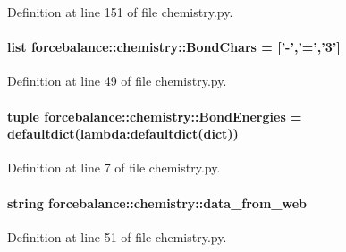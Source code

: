 \-Definition at line 151 of file chemistry.\-py.

\hypertarget{namespaceforcebalance_1_1chemistry_a70b1983d2e59ef37617b0a80a3fd14c9}{
\paragraph[{\-Bond\-Chars}]{\setlength{\rightskip}{0pt plus 5cm}list {\bf forcebalance\-::chemistry\-::\-Bond\-Chars} = \mbox{[}'-\/','=','3'\mbox{]}}}\label{namespaceforcebalance_1_1chemistry_a70b1983d2e59ef37617b0a80a3fd14c9}


\-Definition at line 49 of file chemistry.\-py.

\hypertarget{namespaceforcebalance_1_1chemistry_aa32672abf21f3992401f7869fef4b579}{
\paragraph[{\-Bond\-Energies}]{\setlength{\rightskip}{0pt plus 5cm}tuple {\bf forcebalance\-::chemistry\-::\-Bond\-Energies} = defaultdict(lambda\-:defaultdict(dict))}}\label{namespaceforcebalance_1_1chemistry_aa32672abf21f3992401f7869fef4b579}


\-Definition at line 7 of file chemistry.\-py.

\hypertarget{namespaceforcebalance_1_1chemistry_a244dd58baf4c171b37316e64561c1021}{
\paragraph[{data\-\_\-from\-\_\-web}]{\setlength{\rightskip}{0pt plus 5cm}string {\bf forcebalance\-::chemistry\-::data\-\_\-from\-\_\-web}}}\label{namespaceforcebalance_1_1chemistry_a244dd58baf4c171b37316e64561c1021}


\-Definition at line 51 of file chemistry.\-py.

